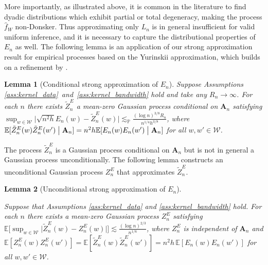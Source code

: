 \documentclass[11pt,lof]{puthesis}
\renewcommand{\P}{\ensuremath{\mathbb{P}}}
\newcommand{\E}{\ensuremath{\mathbb{E}}}
\newcommand{\bA}{\ensuremath{\mathbf{A}}}
\newcommand{\cW}{\ensuremath{\mathcal{W}}}
\theoremstyle{break}
\newtheorem{lemma}{Lemma}[section]
\theoremstyle{proof}
\begin{document}
More importantly, as illustrated above, it is common in the literature to find
dyadic distributions which exhibit partial or total degeneracy, making the
process $\hat{f}_W$ non-Donsker. Thus approximating only $L_n$ is in general
insufficient for valid uniform inference, and it is necessary to capture the
distributional properties of $E_n$ as well.
The following lemma is an application of our strong approximation result for
empirical processes based on the Yurinskii approximation, which builds on a
refinement by \citet{belloni2019conditional}.

\begin{lemma}[Conditional strong approximation of $E_n$]
  \label{lem:kernel_conditional_strong_approx_En}
  Suppose Assumptions \ref{ass:kernel_data}~and~\ref{ass:kernel_bandwidth} hold
  and take any $R_n \to \infty$. For each $n$ there exists $\tilde Z^E_n$
  a mean-zero Gaussian process conditional on $\bA_n$ satisfying
  $\sup_{w \in \cW}
  \big| \sqrt{n^2h} E_n(w) - \tilde Z_n^E(w) \big|
  \lesssim_\P \frac{(\log n)^{3/8} R_n}{n^{1/4}h^{3/8}}$,
  where $\E[\tilde Z_n^E(w)\tilde Z_n^E(w')\bigm\vert \bA_n]
  =n^2h\E[E_n(w)E_n(w')\bigm\vert \bA_n]$
  for all $w, w' \in \cW$.
\end{lemma}

The process $\tilde Z_n^E$ is a Gaussian process conditional on $\bA_n$ but is
not in general a Gaussian process unconditionally. The following lemma
constructs an unconditional Gaussian process $Z_n^E$ that approximates
$\tilde Z_n^E$.

\begin{lemma}[Unconditional strong approximation of $E_n$]
  \label{lem:kernel_unconditional_strong_approx_En}

  Suppose that Assumptions \ref{ass:kernel_data} and
  \ref{ass:kernel_bandwidth} hold. For each $n$ there exists
  a mean-zero Gaussian process $Z^E_n$ satisfying
  $\E\big[ \sup_{w \in \cW} \big|\tilde Z_n^E(w) - Z_n^E(w)\big| \big]
  \lesssim \frac{(\log n)^{2/3}}{n^{1/6}}$,
  where $Z_n^E$ is independent of $\bA_n$ and
  $\E[Z_n^E(w)Z_n^E(w')]=\E[\tilde Z_n^E(w)\tilde Z_n^E(w')]
  = n^2h \, \E[E_n(w)E_n(w')]$ for all $w, w' \in \cW$.
\end{lemma}
\end{document}
